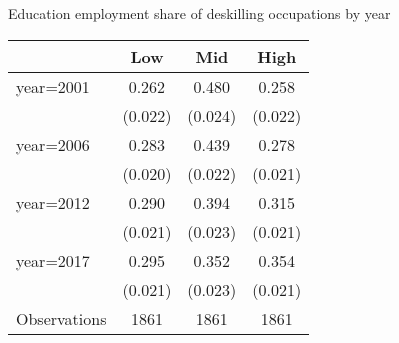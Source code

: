 \begin{center}
\begin{threeparttable}[!h]
\caption{Education employment share of deskilling occupations by year}
\begin{tabular}{lccc}
\toprule
\toprule
\textbf{}&\multicolumn{1}{c}{\textbf{Low}}&\multicolumn{1}{c}{\textbf{Mid}}&\multicolumn{1}{c}{\textbf{High}} \\
\midrule
year=2001           &       0.262&       0.480&       0.258\\
                    &     (0.022)&     (0.024)&     (0.022)\\
year=2006           &       0.283&       0.439&       0.278\\
                    &     (0.020)&     (0.022)&     (0.021)\\
year=2012           &       0.290&       0.394&       0.315\\
                    &     (0.021)&     (0.023)&     (0.021)\\
year=2017           &       0.295&       0.352&       0.354\\
                    &     (0.021)&     (0.023)&     (0.021)\\
Observations        &        1861&        1861&        1861\\
\bottomrule
\bottomrule
\end{tabular}
\end{threeparttable}
\end{center}
